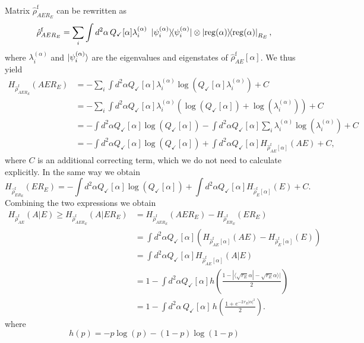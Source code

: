 \documentclass[a4paper]{article}
\newcommand{\prjct}[1]{\mathinner{|{#1}\rangle}\!\!\mathinner{\langle{#1}|}}
\renewcommand{\t}[1]{\mathrm{#1}}
\newcommand{\be}{\begin{equation}}
\newcommand{\ee}{\end{equation}}
\begin{document}
Matrix $\hat{\rho}^\text{f}_{AER_E}$ can be rewritten as
\be
\hat{\rho}^\text{f}_{AER_E} = \sum_i \int d^2 \alpha \, Q_\checkmark[\alpha] \lambda_i^{(\alpha)} \ \prjct{\psi_i^{(\alpha)}} \otimes \prjct{\t{reg}(\alpha)}_{R_E},
\ee
where $\lambda_i^{(\alpha)}$ and $\ket{\psi_i^{(\alpha)}}$ are the eigenvalues and eigenstates of $\hat{\rho}^\text{f}_{AE}[\alpha]$. 
We thus yield
\be
\begin{split}
H_{\hat{\rho}^\text{f}_{AER_E}}(AER_E) &= - \sum_i \int d^2 \alpha Q_\checkmark[\alpha] \lambda_i^{(\alpha)} \log(Q_\checkmark[\alpha] \lambda_i^{(\alpha)})+C\\
& =- \sum_i \int d^2 \alpha Q_\checkmark[\alpha] \lambda_i^{(\alpha)} (\log(Q_\checkmark[\alpha]) + \log( \lambda_i^{(\alpha)})) +C\\
& =  - \int d^2 \alpha Q_\checkmark[\alpha] \log(Q_\checkmark[\alpha]) 
- \int d^2 \alpha Q_\checkmark[\alpha] \sum_i \lambda_i^{(\alpha)} \log(\lambda_i^{(\alpha)}) +C\\
& = - \int d^2 \alpha Q_\checkmark[\alpha] \log(Q_\checkmark[\alpha]) 
+ \int d^2 \alpha Q_\checkmark[\alpha] H_{\hat{\rho}^{\text{f}}_{AE}[\alpha]}(AE) +C,
\end{split}
\ee
where $C$ is an additional correcting term, which we do not need to calculate explicitly.
In the same way we obtain 
\be
H_{\hat{\rho}^\text{f}_{ER_E}}(ER_E) = - \int d^2 \alpha Q_\checkmark[\alpha] \log(Q_\checkmark[\alpha]) 
+ \int d^2 \alpha Q_\checkmark[\alpha] H_{\hat{\rho}^\text{f}_{E}[\alpha]}(E)+C.
\ee
Combining the two expressions we obtain 
\be\begin{split}
     H_{\hat{\rho}^\text{f}_{AE}}(A|E)\geq H_{\hat{\rho}^\text{f}_{AER_E}}(A|E R_E) &= H_{\hat{\rho}^\text{f}_{AER_E}}(AER_E) - H_{\hat{\rho}^\text{f}_{ER_E}}(ER_E) \\
     &= \int d^2 \alpha Q_\checkmark[\alpha] (H_{\hat{\rho}^\text{f}_{AE}[\alpha]}(AE)- H_{\hat{\rho}^\text{f}_{E}[\alpha]}(E))\\
     &= \int d^2 \alpha Q_\checkmark[\alpha] H_{\hat{\rho}^\text{f}_{AE}[\alpha]}(A|E)\\
     &=1 - \int d^2 \alpha Q_{\checkmark}[\alpha] h\left(\frac{1 - |\langle\sqrt{r_E}\alpha|-\sqrt{r_E}\alpha\rangle|}{2}\right)\\
     &= 1- \int d^2 \alpha \,Q_\checkmark[\alpha] \, h\left(\frac{1+e^{-2\, r_E |\alpha|^2}}{2}\right).
\end{split}
\ee
where
\begin{equation}
    h(p) = -p\log(p) - (1 - p)\log(1 - p)
\end{equation}
\end{document}
